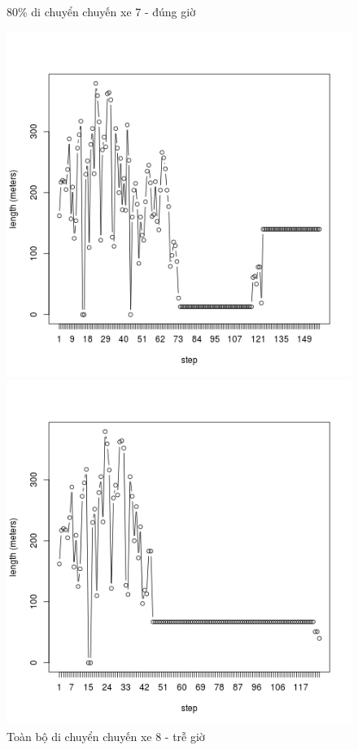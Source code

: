 \documentclass[a4paper, 13pt]{report}
\begin{document}
\begin{figure}[!htb]
  \caption*{80\% di chuyển chuyến xe 7 - đúng giờ}
\endminipage
{}%
  \includegraphics[width=\linewidth]{test_100_8}
  \caption*{Toàn bộ di chuyển chuyến xe 8 - trễ giờ}
\endminipage
{}
  \includegraphics[width=\linewidth]{test_80_8}

\end{figure}
\end{document}
